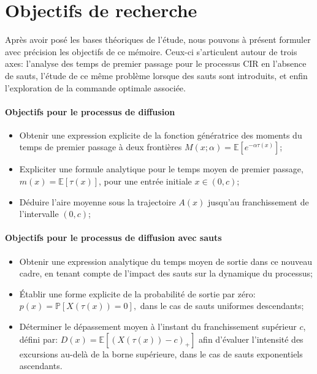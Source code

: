 \clearpage

\section{Objectifs de recherche}  %

Après avoir posé les bases théoriques de l'étude, nous pouvons à présent formuler avec précision les objectifs de ce mémoire. Ceux-ci s'articulent autour de trois axes: l'analyse des temps de premier passage pour le processus \acs{CIR} en l'absence de sauts, l'étude de ce même problème lorsque des sauts sont introduits, et enfin l'exploration de la commande optimale associée.
\paragraph{Objectifs pour le processus de diffusion}
\begin{itemize}
    \item Obtenir une expression explicite de la fonction génératrice des moments du temps de premier passage à deux frontières \( M(x;\alpha) = \mathds{E}[e^{-\alpha \tau(x)}] \);
    \item Expliciter une formule analytique pour le temps moyen de premier passage, \( m(x) = \mathds{E}[\tau(x)] \), pour une entrée initiale \( x \in (0,c) \);
    \item Déduire l'aire moyenne sous la trajectoire $A(x)$ jusqu'au franchissement de l'intervalle \( (0,c) \);
\end{itemize}
\paragraph{Objectifs pour le processus de diffusion avec sauts}
\begin{itemize}
    \item Obtenir une expression analytique du temps moyen de sortie dans ce nouveau cadre, en tenant compte de l'impact des sauts sur la dynamique du processus;
    \item Établir une forme explicite de la probabilité de sortie par zéro:
    \(
    p(x) = \mathds{P}[X(\tau(x)) = 0],
    \)
    dans le cas de sauts uniformes descendants;
    \item Déterminer le dépassement moyen à l'instant du franchissement supérieur \( c \), défini par:
    \(
    D(x) = \mathds{E}[(X(\tau(x)) - c)_+]
    \)
    afin d'évaluer l'intensité des excursions au-delà de la borne supérieure, dans le cas de sauts exponentiels ascendants.
\end{itemize}
